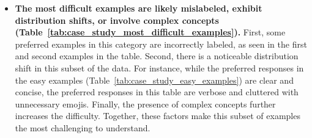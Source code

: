 \clearpage
\begin{itemize}
    \item \textbf{The most difficult examples are likely mislabeled, exhibit distribution shifts, or involve complex concepts (Table~\ref{tab:case_study_most_difficult_examples}).} First, some preferred examples in this category are incorrectly labeled, as seen in the first and second examples in the table. Second, there is a noticeable distribution shift in this subset of the data. For instance, while the preferred responses in the easy examples (Table~\ref{tab:case_study_easy_examples}) are clear and concise, the preferred responses in this table are verbose and cluttered with unnecessary emojis. Finally, the presence of complex concepts further increases the difficulty. Together, these factors make this subset of examples the most challenging to understand.
\end{itemize}
